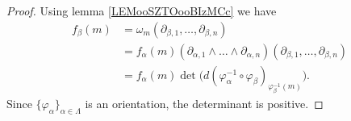 \begin{proof}
	Using lemma \ref{LEMooSZTOooBIzMCc} we have
	\begin{subequations}
		\begin{align}
			f_{\beta}(m) & =\omega_m(\partial_{\beta,1},\ldots,\partial_{\beta,n})                                                                \\
			             & =f_{\alpha}(m)(\partial_{\alpha,1}\wedge\ldots\wedge\partial_{\alpha,n})(\partial_{\beta,1},\ldots,\partial_{\beta,n}) \\
			             & =f_{\alpha}(m)\det\big( d(\varphi_{\alpha}^{-1}\circ\varphi_{\beta})_{\varphi_{\beta}^{-1}(m)} \big).
		\end{align}
	\end{subequations}
	Since \( \{ \varphi_{\alpha} \}_{\alpha\in \Lambda}\) is an orientation, the determinant is positive.
\end{proof}


